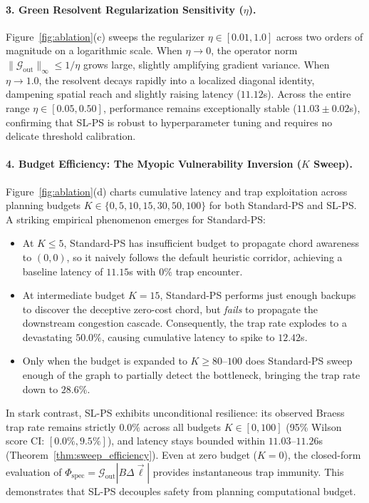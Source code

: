 \documentclass[11pt,a4paper]{article}
\begin{document}
\paragraph{3. Green Resolvent Regularization Sensitivity ($\eta$).}
Figure~\ref{fig:ablation}(c) sweeps the regularizer $\eta \in [0.01, 1.0]$ across two orders of magnitude on a logarithmic scale. When $\eta \to 0$, the operator norm $\|\mathcal{G}_{\text{out}}\|_\infty \le 1/\eta$ grows large, slightly amplifying gradient variance. When $\eta \to 1.0$, the resolvent decays rapidly into a localized diagonal identity, dampening spatial reach and slightly raising latency ($11.12$s). Across the entire range $\eta \in [0.05, 0.50]$, performance remains exceptionally stable ($11.03 \pm 0.02$s), confirming that SL-PS is robust to hyperparameter tuning and requires no delicate threshold calibration.

\paragraph{4. Budget Efficiency: The Myopic Vulnerability Inversion ($K$ Sweep).}
Figure~\ref{fig:ablation}(d) charts cumulative latency and trap exploitation across planning budgets $K \in \{0, 5, 10, 15, 30, 50, 100\}$ for both Standard-PS and SL-PS. A striking empirical phenomenon emerges for Standard-PS:
\begin{itemize}
    \item At $K \le 5$, Standard-PS has insufficient budget to propagate chord awareness to $(0, 0)$, so it naively follows the default heuristic corridor, achieving a baseline latency of $11.15$s with $0\%$ trap encounter.
    \item At intermediate budget $K = 15$, Standard-PS performs just enough backups to discover the deceptive zero-cost chord, but \textit{fails} to propagate the downstream congestion cascade. Consequently, the trap rate explodes to a devastating $\mathbf{50.0\%}$, causing cumulative latency to spike to $\mathbf{12.42}$s.
    \item Only when the budget is expanded to $K \ge 80$--$100$ does Standard-PS sweep enough of the graph to partially detect the bottleneck, bringing the trap rate down to $28.6\%$.
\end{itemize}
In stark contrast, SL-PS exhibits unconditional resilience: its observed Braess trap rate remains strictly $\mathbf{0.0\%}$ across all budgets $K \in [0, 100]$ (95\% Wilson score CI: $[0.0\%, 9.5\%]$), and latency stays bounded within $11.03$--$11.26$s (Theorem~\ref{thm:sweep_efficiency}). Even at zero budget ($K = 0$), the closed-form evaluation of $\Phi_{\text{spec}} = \mathcal{G}_{\text{out}} |B \Delta \vec{\ell}|$ provides instantaneous trap immunity. This demonstrates that SL-PS decouples safety from planning computational budget.
\end{document}

